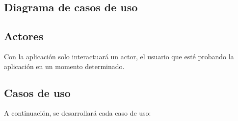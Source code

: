 \subsection{Diagrama de casos de uso}

\subsection{Actores}
Con la aplicación solo interactuará un actor, el usuario que esté probando la aplicación en un momento determinado.

\subsection{Casos de uso}
A continuación, se desarrollará cada caso de uso: